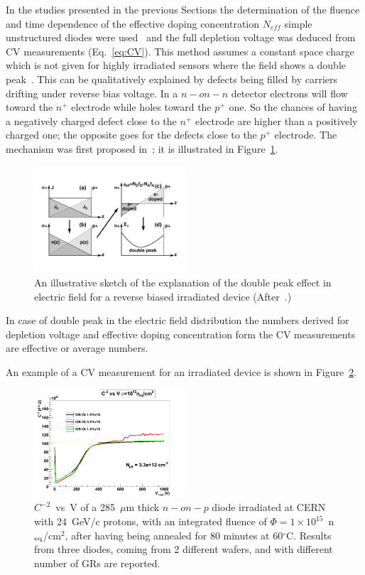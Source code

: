 In the studies presented in the previous Sections the determination of the fluence and time 
dependence of the effective doping concentration  $N_{eff}$
simple unstructured diodes were used~\cite{moll-thesis} 
and the full depletion voltage was deduced from CV 
measurements (Eq.~\ref{eq:CV}). This method assumes a constant space charge which is not 
given 
for highly irradiated sensors where the field shows a double peak~\cite{Li1992}. This can be 
qualitatively explained by defects being filled by carriers drifting under reverse bias voltage. 
In a $n-on-n$ detector electrons will flow toward the $n^+$ electrode while holes toward the $p^+$ one. 
So the chances of having a negatively charged defect close to the   $n^+$ electrode  are higher 
than a positively charged one; the opposite goes for the defects close to the $p^+$ electrode. 
The mechanism was first proposed in~\cite{bib:DP};
 it is illustrated in Figure~\ref{fig:Chiochia2005DP}.
\begin{figure}[htpb]
 \centering
 \includegraphics[width=0.5\textwidth]{Chiochia2005DP.pdf}
 \caption{\label{fig:Chiochia2005DP} An illustrative sketch of the explanation of the double peak effect in electric field  for a reverse biased irradiated device (After~\cite{Chiochia2005}.)}
 \end{figure}

In case of double peak in the electric field distribution the numbers derived for depletion voltage and 
effective doping concentration form the CV measurements 
are effective or average numbers.

An example of a CV measurement for an irradiated device is shown in Figure~\ref{fig:irrCV}.
\begin{figure}[htpb]
 \centering
\includegraphics[width=0.5\textwidth]{irrad2011-fl1e15-best.png}
 \caption{\label{fig:irrCV} $C^{-2}$~vs~V of a 285~$\mu$m thick $n-on-p$ diode irradiated at CERN 
 with 24~GeV/c protons, with an integrated fluence of $\Phi=1\times10^{15}$~n$_{\rm eq}$/cm$^2$, 
 after having being annealed for 80 minutes at 60$^\circ$C. Results from three diodes, 
 coming from 2 different 
 wafers, and with different number of GRs are reported.  
}  
 \end{figure}
 
